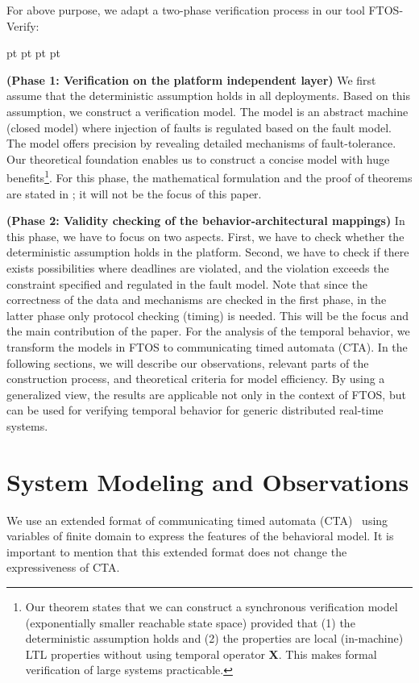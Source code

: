\documentclass[10pt, a4paper, onecolumn, conference, compsocconf]{IEEEtran}
\newenvironment{list1}{\begin{list}{}
{\topsep 0 pt \parsep 0 pt \partopsep 0 pt \itemsep 0
pt}}{\end{list}}
\begin{document}
For above purpose, we adapt a two-phase verification process in our tool FTOS-Verify:
\begin{list1}
\item \textbf{(Phase 1: Verification on the platform independent layer)} We first assume that the deterministic assumption holds in all deployments. Based on this assumption, we construct a verification model. The model is an abstract machine (closed model) where injection of faults is regulated based on the fault model. The model offers precision by revealing detailed mechanisms of fault-tolerance. Our theoretical
      foundation enables us to construct a concise model with huge benefits\footnote{Our theorem states that we can construct a synchronous verification model (exponentially smaller reachable state space) provided that (1) the deterministic assumption holds and (2) the properties are local (in-machine) LTL properties without
      using temporal operator \textbf{X}. This makes formal verification of large systems practicable.}. For this phase, the mathematical formulation and the proof of theorems are stated in \cite{Cheng:2009:FTOSVerify}; it will not be the focus of this paper.

\item \textbf{(Phase 2: Validity checking of the behavior-architectural mappings)} In this phase, we have to focus on two aspects. First, we have to check whether the deterministic assumption holds in the platform. Second, we have to check if there exists possibilities where deadlines are violated, and the violation exceeds the constraint specified and regulated in the fault model. Note that since the correctness of the data and mechanisms are checked in the first phase, in the latter phase only protocol checking (timing) is needed. This will be the focus and the main contribution of the paper. For the analysis of the temporal behavior, we transform the models in FTOS to communicating timed automata (CTA). In the following sections, we will describe our observations, relevant parts of the construction process, and theoretical criteria for model efficiency. By using a generalized view, the results are applicable not only in the context of FTOS, but can be used for verifying temporal behavior for generic distributed real-time systems.
\end{list1}

\section{System Modeling and Observations\label{sec.System.Modeling.Observations}}
We use an extended format of communicating timed automata (CTA)~\cite{bdl:2004:uppaal} using variables of finite domain to express the features of the behavioral model. It is important to mention that this extended format does not change the expressiveness of CTA.
\end{document}

